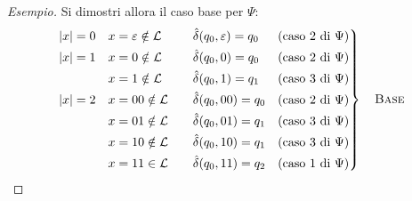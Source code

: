 \documentclass[a4paper, 11pt, oneside]{book}
\theoremstyle{formale}
\newenvironment{esempio}
    {\begin{proof}[\textit{Esempio}]\renewcommand{\qedsymbol}{$\diamond$}}
    {\end{proof}}
\begin{document}
\begin{esempio}
        Si dimostri allora il caso base per $\Psi$:
        \begin{equation*}
            \left.
            \begin{alignedat}{3}
                |x| = 0 \quad & x = \varepsilon \notin \mathcal{L} & \qquad
                    & \hat{\delta}(q_0, \varepsilon) = q_0
                    &\quad \text{(caso 2 di $\Psi$)} \\
                |x| = 1 \quad & x = 0 \notin \mathcal{L} &
                    & \hat{\delta}(q_0, 0) = q_0
                    &\quad \text{(caso 2 di $\Psi$)} \\
                & x = 1 \notin \mathcal{L} &
                    & \hat{\delta}(q_0, 1) = q_1
                    &\quad \text{(caso 3 di $\Psi$)} \\
                |x| = 2 \quad & x = 00 \notin \mathcal{L} &
                    & \hat{\delta}(q_0, 00) = q_0
                    &\quad \text{(caso 2 di $\Psi$)} \\
                & x = 01 \notin \mathcal{L} &
                    & \hat{\delta}(q_0, 01) = q_1
                    &\quad \text{(caso 3 di $\Psi$)} \\
                & x = 10 \notin \mathcal{L} &
                    & \hat{\delta}(q_0, 10) = q_1
                    &\quad \text{(caso 3 di $\Psi$)} \\
                & x = 11 \in \mathcal{L} &
                    & \hat{\delta}(q_0, 11) = q_2
                    &\quad \text{(caso 1 di $\Psi$)}
            \end{alignedat}
            \right\}
            \quad \text{\textsc{Base}}
        \end{equation*}


\end{esempio}
\end{document}
